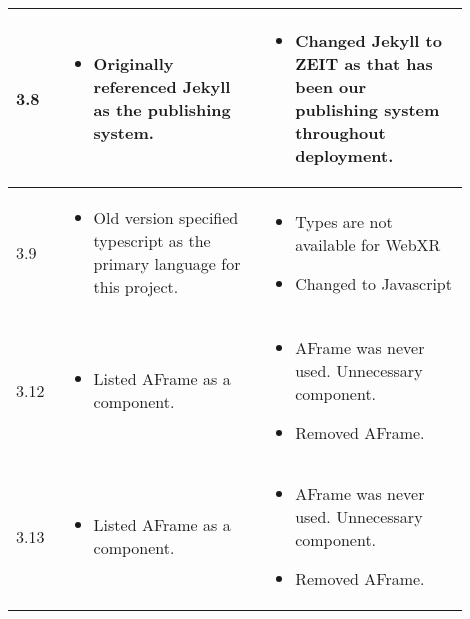 \documentclass[onecolumn, draftclsnofoot,10pt, compsoc]{IEEEtran}
\begin{document}
\begin{longtable}{ |p{0.1\linewidth}|p{0.4\linewidth}|p{0.4\linewidth}| }
3.8
&
\begin{itemize}
    \item Originally referenced Jekyll as the publishing system.
\end{itemize}
&
\begin{itemize}
    \item Changed Jekyll to ZEIT as that has been our publishing system throughout deployment.
\end{itemize} \\
\hline

3.9
&
\begin{itemize}
    \item Old version specified typescript as the primary language for this project.
\end{itemize}
&
\begin{itemize}
    \item Types are not available for WebXR
    \item Changed to Javascript
\end{itemize} \\
\hline

3.12
&
\begin{itemize}
    \item Listed AFrame as a component.
\end{itemize}
&
\begin{itemize}
    \item AFrame was never used. Unnecessary component.
    \item Removed AFrame.
\end{itemize} \\
\hline

3.13
&
\begin{itemize}
    \item Listed AFrame as a component.
\end{itemize}
&
\begin{itemize}
    \item AFrame was never used. Unnecessary component.
    \item Removed AFrame.
\end{itemize} \\
\hline


\end{longtable}
\end{document}

